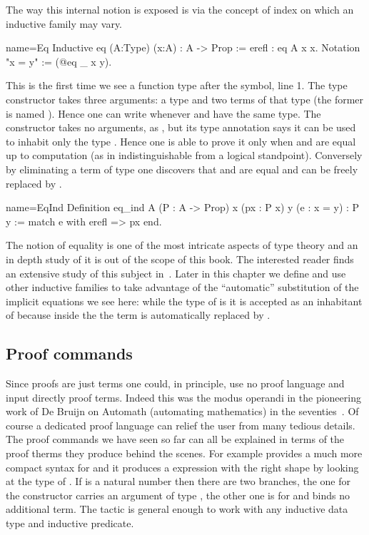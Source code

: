 The way this internal notion is exposed is via the concept of index
on which an inductive family may vary.

\begin{coq}{name=Eq}{}
Inductive eq (A:Type) (x:A) : A -> Prop := erefl : eq A x x.
Notation "x = y" := (@eq _ x y).
\end{coq}

This is the first time we see a function type after the \C{:} symbol, line 1.
The  type constructor takes three arguments: a type  and
two terms of that type (the former is named ).
Hence one can write  whenever  and 
have the same type.
The  constructor takes no arguments, as , but its type
annotation says it can be used to inhabit only the type .
Hence one is able to prove  it only when  and  are
equal up to computation (as in indistinguishable from a logical standpoint).
Conversely by eliminating a term
of type  one discovers that   and  are
equal and  can be freely replaced by .

\begin{coq}{name=EqInd}{}
Definition eq_ind A (P : A -> Prop) x (px : P x) y (e : x = y) : P y :=
  match e with erefl => px end.
\end{coq}

The notion of equality is one of the most intricate aspects of type
theory and an in depth study of it is out of the scope of this book.  The interested reader
finds an extensive study of this subject in~\cite{hottbook}.  Later in this
chapter we define and use other inductive families to take advantage
of the ``automatic'' substitution of the implicit equations we see here:
while the type of  is  it is accepted as an
inhabitant of  because inside the  the term 
is automatically replaced by .

\subsection{Proof commands}

Since proofs are just terms one could,
in principle, use no proof language and input directly proof terms.
Indeed this was the modus operandi in the pioneering work of
De Bruijn on Automath (automating mathematics) in the seventies~\cite{nederpelt-94}.
Of course a dedicated proof language can relief the user from
many tedious details.  The proof commands we have seen so far can all be
explained in terms of the proof therms they produce behind the scenes.
For example  provides a much more compact syntax
for  and it produces a
 expression with the right
shape by looking at the type of .  If  is a natural number then there
are two branches, the one for the  constructor carries an argument of type
, the other one is for  and binds no additional term.
The  tactic is general enough to work with any inductive data type
and inductive predicate.


